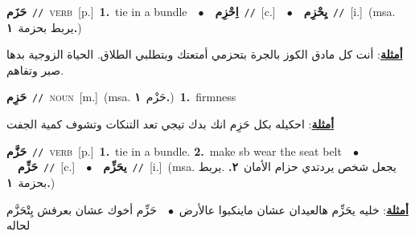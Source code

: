 \documentclass[10pt,a4paper,twoside]{article} %
\begin{document}
\begin{multicols}{2}
{\setlength\topsep{0pt}\textbf{\foreignlanguage{arabic}{حَزَم}}\ {\color{gray}\texttt{//}\color{black}}\ \textsc{verb}\ [p.]\ \textbf{1.}~tie in a bundle\ \ $\bullet$\ \ \setlength\topsep{0pt}\textbf{\foreignlanguage{arabic}{اِحْزِم}}\ {\color{gray}\texttt{//}\color{black}}\ [c.]\ \ $\bullet$\ \ \setlength\topsep{0pt}\textbf{\foreignlanguage{arabic}{يِحْزِم}}\ {\color{gray}\texttt{//}\color{black}}\ [i.]\ \color{gray}(msa. \foreignlanguage{arabic}{يربط بحزمة}~\foreignlanguage{arabic}{\textbf{١.}})\color{black}\  \begin{flushright}\color{gray}\foreignlanguage{arabic}{\textbf{\underline{\foreignlanguage{arabic}{أمثلة}}}: أنت كل مادق الكوز بالجرة بتحزمي أمتعتك وبتطلبي الطلاق. الحياة الزوجية بدها صبر وتفاهم.}\end{flushright}\color{black}} \vspace{2mm}

{\setlength\topsep{0pt}\textbf{\foreignlanguage{arabic}{حَزِم}}\ {\color{gray}\texttt{//}\color{black}}\ \textsc{noun}\ [m.]\ \color{gray}(msa. \foreignlanguage{arabic}{حَزْم}~\foreignlanguage{arabic}{\textbf{١.}})\color{black}\ \textbf{1.}~firmness\  \begin{flushright}\color{gray}\foreignlanguage{arabic}{\textbf{\underline{\foreignlanguage{arabic}{أمثلة}}}: احكيله بكل حَزِم انك بدك تيجي تعد التنكات وتشوف كمية الجفت}\end{flushright}\color{black}} \vspace{2mm}

{\setlength\topsep{0pt}\textbf{\foreignlanguage{arabic}{حَزَّم}}\ {\color{gray}\texttt{//}\color{black}}\ \textsc{verb}\ [p.]\ \textbf{1.}~tie in a bundle.  \textbf{2.}~make sb wear the seat belt\ \ $\bullet$\ \ \setlength\topsep{0pt}\textbf{\foreignlanguage{arabic}{حَزِّم}}\ {\color{gray}\texttt{//}\color{black}}\ [c.]\ \ $\bullet$\ \ \setlength\topsep{0pt}\textbf{\foreignlanguage{arabic}{يحَزِّم}}\ {\color{gray}\texttt{//}\color{black}}\ [i.]\ \color{gray}(msa. \foreignlanguage{arabic}{يجعل شخص يردتدي حزام الأمان}~\foreignlanguage{arabic}{\textbf{٢.}}  .\foreignlanguage{arabic}{يربط بحزمة}~\foreignlanguage{arabic}{\textbf{١.}})\color{black}\  \begin{flushright}\color{gray}\foreignlanguage{arabic}{\textbf{\underline{\foreignlanguage{arabic}{أمثلة}}}: خليه يحَزِّم هالعيدان عشان ماينكبوا عالأرض\ $\bullet$\ \  حَزِّم أخوك عشان بعرفش يِتْحَزَّم لحاله}\end{flushright}\color{black}} \vspace{2mm}


\end{multicols}
\end{document}
